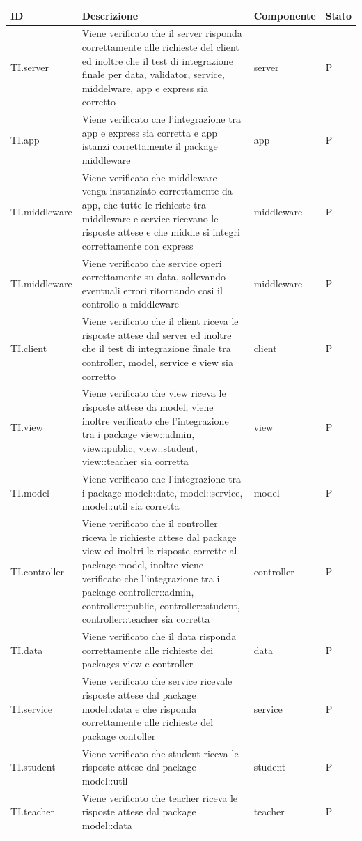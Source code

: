 \documentclass[12pt,a4paper]{article}
\begin{document}
	\begin{longtable}{l p{8cm} l l}
		\midrule
		\textbf{ID} & \textbf{Descrizione} & \textbf{Componente} & \textbf{Stato} \tabularnewline
		\midrule
		\midrule
		TI.server & Viene verificato che il server risponda correttamente alle richieste del client ed inoltre che il test di integrazione finale per data, validator, service, middelware, app e express sia corretto & server & P\tabularnewline
		\midrule
		TI.app & Viene verificato che  l'integrazione tra app e express sia corretta e app istanzi correttamente il package middleware & app & P\tabularnewline
		\midrule
		TI.middleware & Viene verificato che middleware venga instanziato correttamente da app, che tutte le richieste tra middleware e service ricevano le risposte attese e che middle si integri correttamente con express  & middleware & P\tabularnewline
		\midrule
		TI.middleware & Viene verificato che service operi correttamente su data, sollevando eventuali errori ritornando cosi il controllo a middleware & middleware & P\tabularnewline
		\midrule
		TI.client & Viene verificato che il client riceva le risposte attese dal server ed inoltre che il test di integrazione finale tra controller, model, service e view sia corretto & client & P\tabularnewline
		\midrule
		TI.view & Viene verificato che view riceva le risposte attese da model, viene inoltre verificato che l'integrazione tra i package view::admin, view::public, view::student, view::teacher sia corretta & view & P\tabularnewline
		\midrule
		TI.model & Viene verificato che l'integrazione tra i package model::date, model::service, model::util sia corretta & model & P\tabularnewline
		\midrule
		TI.controller & Viene verificato che il controller riceva le richieste attese dal package view ed inoltri le risposte corrette al package model, inoltre viene verificato che l'integrazione tra i package controller::admin, controller::public, controller::student, controller::teacher sia corretta & controller & P\tabularnewline
		\midrule
		TI.data & Viene verificato che il data risponda correttamente alle richieste dei packages view e controller & data & P\tabularnewline
		\midrule
		TI.service & Viene verificato che service ricevale risposte attese dal package model::data e che risponda correttamente alle richieste del package contoller & service & P\tabularnewline
		\midrule
		TI.student & Viene verificato che student riceva le risposte attese dal package model::util & student & P\tabularnewline
		\midrule
		TI.teacher & Viene verificato che teacher riceva le risposte attese dal package model::data & teacher & P\tabularnewline

\end{longtable}
\end{document}
